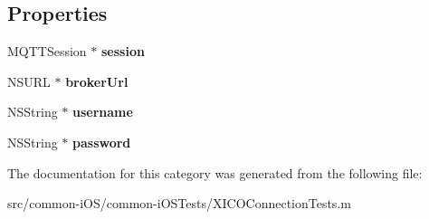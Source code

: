 \subsection*{Properties}
\begin{DoxyCompactItemize}
\item 
\hypertarget{category_x_i_c_o_connection_07_x_i_c_o_connection_unit_test_08_a3da0996cc4356fbc1d419a7e6a61532a}{}\label{category_x_i_c_o_connection_07_x_i_c_o_connection_unit_test_08_a3da0996cc4356fbc1d419a7e6a61532a} 
M\+Q\+T\+T\+Session $\ast$ {\bfseries session}
\item 
\hypertarget{category_x_i_c_o_connection_07_x_i_c_o_connection_unit_test_08_a050babe5361c292aec0773da06926813}{}\label{category_x_i_c_o_connection_07_x_i_c_o_connection_unit_test_08_a050babe5361c292aec0773da06926813} 
N\+S\+U\+RL $\ast$ {\bfseries broker\+Url}
\item 
\hypertarget{category_x_i_c_o_connection_07_x_i_c_o_connection_unit_test_08_a75b0e25f550a48bcf704a7e5c9544cbe}{}\label{category_x_i_c_o_connection_07_x_i_c_o_connection_unit_test_08_a75b0e25f550a48bcf704a7e5c9544cbe} 
N\+S\+String $\ast$ {\bfseries username}
\item 
\hypertarget{category_x_i_c_o_connection_07_x_i_c_o_connection_unit_test_08_ae090388e4128b67ca85213c424013716}{}\label{category_x_i_c_o_connection_07_x_i_c_o_connection_unit_test_08_ae090388e4128b67ca85213c424013716} 
N\+S\+String $\ast$ {\bfseries password}
\end{DoxyCompactItemize}


The documentation for this category was generated from the following file\+:\begin{DoxyCompactItemize}
\item 
src/common-\/i\+O\+S/common-\/i\+O\+S\+Tests/X\+I\+C\+O\+Connection\+Tests.\+m\end{DoxyCompactItemize}
